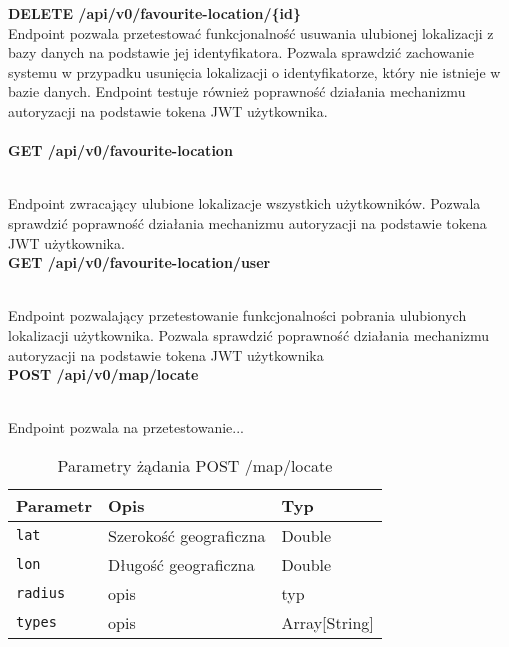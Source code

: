 \documentclass{article}
\begin{document}
\noindent\textbf{DELETE /api/v0/favourite-location/\{id\}}
\\

\noindent
Endpoint pozwala przetestować funkcjonalność usuwania ulubionej lokalizacji z bazy danych na podstawie jej identyfikatora. Pozwala sprawdzić zachowanie systemu w przypadku usunięcia lokalizacji o identyfikatorze, który nie istnieje w bazie danych. Endpoint testuje również poprawność działania mechanizmu autoryzacji na podstawie tokena JWT użytkownika.
\\
\\
\noindent\textbf{GET /api/v0/favourite-location}

\noindent
\\
Endpoint zwracający ulubione lokalizacje wszystkich użytkowników. Pozwala sprawdzić poprawność działania mechanizmu autoryzacji na podstawie tokena JWT użytkownika.
\\

\noindent\textbf{GET /api/v0/favourite-location/user} 

\noindent
\\
Endpoint pozwalający przetestowanie funkcjonalności pobrania ulubionych lokalizacji użytkownika. Pozwala sprawdzić poprawność działania mechanizmu autoryzacji na podstawie tokena JWT użytkownika
\\

\noindent\textbf{POST /api/v0/map/locate}

\noindent
\\
Endpoint pozwala na przetestowanie{...}

\begin{table}[h!]
\centering
\begin{tabular}{|l|l|l|}
\hline
\textbf{Parametr} & \textbf{Opis} & \textbf{Typ} \\
\hline
\texttt{lat} & Szerokość geograficzna & Double \\
\texttt{lon} & Długość geograficzna & Double \\
\texttt{radius} & opis & typ \\
\texttt{types} & opis & Array[String] \\
\hline
\end{tabular}
\caption{Parametry żądania POST /map/locate}
\end{table}

\printbibliography
\end{document}
